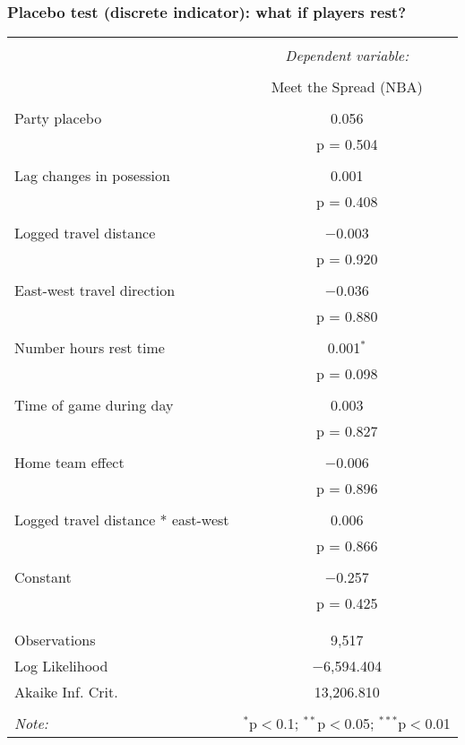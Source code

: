 \documentclass{beamer}
\begin{document}
\begin{frame}   \frametitle{Placebo test (discrete indicator): what if players rest?}
  \centering
  \tiny{ %
\begin{tabular}{@{\extracolsep{5pt}}lc}  \\[-1.8ex]\hline  \hline \\[-1.8ex]   & \multicolumn{1}{c}{\textit{Dependent variable:}} \\  \cline{2-2}  \\[-1.8ex] & Meet the Spread (NBA) \\  \hline \\[-1.8ex]   Party placebo & 0.056 \\    & p = 0.504 \\    & \\   Lag changes in posession & 0.001 \\    & p = 0.408 \\    & \\   Logged travel distance & $-$0.003 \\    & p = 0.920 \\    & \\   East-west travel direction & $-$0.036 \\    & p = 0.880 \\    & \\   Number hours rest time & 0.001$^{*}$ \\    & p = 0.098 \\    & \\   Time of game during day & 0.003 \\    & p = 0.827 \\    & \\   Home team effect & $-$0.006 \\    & p = 0.896 \\    & \\   Logged travel distance * east-west & 0.006 \\    & p = 0.866 \\    & \\   Constant & $-$0.257 \\    & p = 0.425 \\    & \\  \hline \\[-1.8ex]  Observations & 9,517 \\  Log Likelihood & $-$6,594.404 \\  Akaike Inf. Crit. & 13,206.810 \\  \hline  \hline \\[-1.8ex]  \textit{Note:}  & \multicolumn{1}{r}{$^{*}$p$<$0.1; $^{**}$p$<$0.05; $^{***}$p$<$0.01} \\  \end{tabular}      }
\end{frame}
\end{document}
